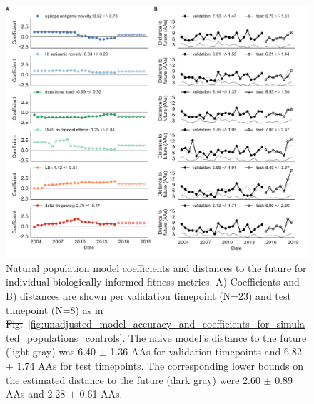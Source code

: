 \documentclass[9pt,lineno]{elife} %
\providecommand{\DIFadd}[1]{{\protect\color{blue}\uwave{#1}}} %
\providecommand{\DIFdel}[1]{{\protect\color{red}\sout{#1}}}                      %
\providecommand{\DIFaddFL}[1]{\DIFadd{#1}} %
\providecommand{\DIFdelFL}[1]{\DIFdel{#1}} %
\providecommand{\DIFaddbeginFL}{} %
\providecommand{\DIFaddendFL}{} %
\providecommand{\DIFdelbeginFL}{} %
\providecommand{\DIFdelendFL}{} %
\providecommand{\DIFaddtex}[1]{{\protect\color{blue}\uwave{#1}}} %
\providecommand{\DIFdeltex}[1]{{\protect\color{red}\sout{#1}}}                      %
\providecommand{\DIFaddFL}[1]{\DIFadd{#1}} %
\providecommand{\DIFdelFL}[1]{\DIFdel{#1}} %
\providecommand{\DIFaddbeginFL}{} %
\providecommand{\DIFaddendFL}{} %
\providecommand{\DIFdelbeginFL}{} %
\providecommand{\DIFdelendFL}{} %
\providecommand{\DIFadd}[1]{\texorpdfstring{\DIFaddtex{#1}}{#1}} %
\providecommand{\DIFdel}[1]{\texorpdfstring{\DIFdeltex{#1}}{}} %
\newcommand{\DIFscaledelfig}{0.5}
\newlength{\DIFdelgraphicswidth} %
\newlength{\DIFdelgraphicsheight} %
\newcommand{\DIFaddincludegraphics}[2][]{{\color{blue}\fbox{\DIFOincludegraphics[#1]{#2}}}} %
\newcommand{\DIFdelincludegraphics}[2][]{%
\sbox{\DIFdelgraphicsbox}{\DIFOincludegraphics[#1]{#2}}%
\settoboxwidth{\DIFdelgraphicswidth}{\DIFdelgraphicsbox} %
\settoboxtotalheight{\DIFdelgraphicsheight}{\DIFdelgraphicsbox} %
\scalebox{\DIFscaledelfig}{%
\parbox[b]{\DIFdelgraphicswidth}{\usebox{\DIFdelgraphicsbox}\\[-\baselineskip] \rule{\DIFdelgraphicswidth}{0em}}\llap{\resizebox{\DIFdelgraphicswidth}{\DIFdelgraphicsheight}{%
\setlength{\unitlength}{\DIFdelgraphicswidth}%
\begin{picture}(1,1)%
\thicklines\linethickness{2pt} %
{\color[rgb]{1,0,0}\put(0,0){\framebox(1,1){}}}%
{\color[rgb]{1,0,0}\put(0,0){\line( 1,1){1}}}%
{\color[rgb]{1,0,0}\put(0,1){\line(1,-1){1}}}%
\end{picture}%
}\hspace*{3pt}}} %
} %
\DeclareRobustCommand{\DIFaddbeginFL}{\DIFOaddbeginFL \let\includegraphics\DIFaddincludegraphics} %
\DeclareRobustCommand{\DIFaddendFL}{\DIFOaddendFL \let\includegraphics\DIFOincludegraphics} %
\DeclareRobustCommand{\DIFdelbeginFL}{\DIFOdelbeginFL \let\includegraphics\DIFdelincludegraphics} %
\DeclareRobustCommand{\DIFdelendFL}{\DIFOaddendFL \let\includegraphics\DIFOincludegraphics} %
\begin{document}
\begin{figure}[htb]
  \DIFdelbeginFL %
\DIFdelendFL \DIFaddbeginFL \includegraphics[width=\textwidth]{Figure_5.pdf}
  \DIFaddendFL \caption{
    Natural population model coefficients and distances to the future for individual biologically-informed fitness metrics.
    A) Coefficients and B) distances are shown per validation timepoint (N=23) and test timepoint (N=8) as in \DIFdelbeginFL \DIFdelFL{Fig.}\DIFdelendFL \DIFaddbeginFL \DIFaddFL{Figure}\DIFaddendFL ~\ref{fig:unadjusted_model_accuracy_and_coefficients_for_simulated_populations_controls}.
    The naive model's distance to the future (light gray) was 6.40 $\pm$ 1.36 AAs for validation timepoints and 6.82 $\pm$ 1.74 AAs for test timepoints.
    The corresponding lower bounds on the estimated distance to the future (dark gray) were 2.60 $\pm$ 0.89 AAs and 2.28 $\pm$ 0.61 AAs.
  }
  \label{fig:unadjusted_model_accuracy_and_coefficients_for_natural_populations}
\DIFdelbeginFL %
\DIFdelendFL \DIFaddbeginFL 


\end{figure}
\end{document}
